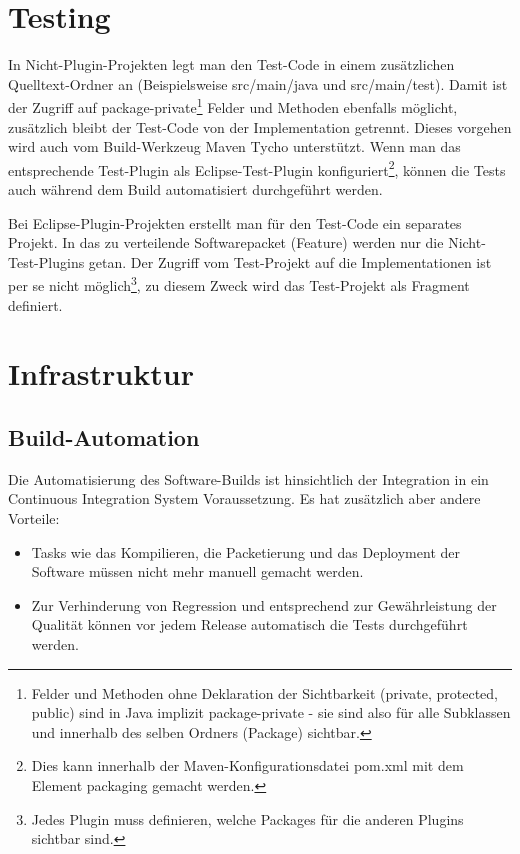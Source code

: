 \section{Testing}\label{testing}
In Nicht-Plugin-Projekten legt man den Test-Code in einem zusätzlichen Quelltext-Ordner an (Beispielsweise src/main/java und src/main/test). Damit ist der Zugriff auf package-private\footnote{Felder und Methoden ohne Deklaration der Sichtbarkeit (private, protected, public) sind in Java implizit package-private - sie sind also für alle Subklassen und innerhalb des selben Ordners (Package) sichtbar. } Felder und Methoden ebenfalls möglicht, zusätzlich bleibt der Test-Code von der Implementation getrennt. Dieses vorgehen wird auch vom Build-Werkzeug Maven Tycho unterstützt. Wenn man das entsprechende Test-Plugin als Eclipse-Test-Plugin konfiguriert\footnote{Dies kann innerhalb der Maven-Konfigurationsdatei pom.xml mit dem Element packaging gemacht werden.}, können die Tests auch während dem Build automatisiert durchgeführt werden.

Bei Eclipse-Plugin-Projekten erstellt man für den Test-Code ein separates Projekt. In das zu verteilende Softwarepacket (Feature) werden nur die Nicht-Test-Plugins getan. Der Zugriff vom Test-Projekt auf die Implementationen ist per se nicht möglich\footnote{Jedes Plugin muss definieren, welche Packages für die anderen Plugins sichtbar sind.}, zu diesem Zweck wird das Test-Projekt als Fragment definiert.

\section{Infrastruktur}
\subsection{Build-Automation}
Die Automatisierung des Software-Builds ist hinsichtlich der Integration in ein Continuous Integration System Voraussetzung. Es hat zusätzlich aber andere Vorteile:
\begin{itemize}
	\item Tasks wie das Kompilieren, die Packetierung und das Deployment der Software müssen nicht mehr manuell gemacht werden.
	\item Zur Verhinderung von Regression und entsprechend zur Gewährleistung der Qualität können vor jedem Release automatisch die Tests durchgeführt werden.
\end{itemize}

